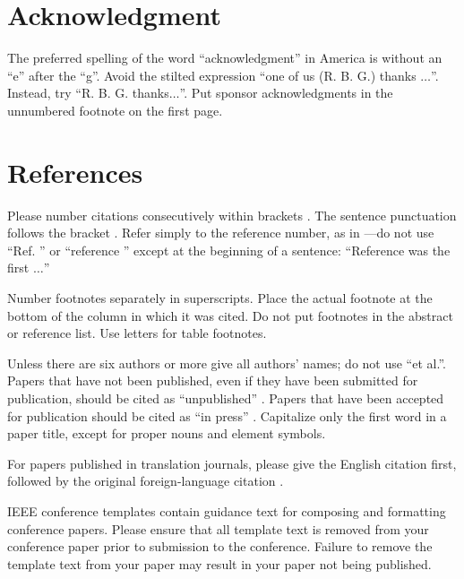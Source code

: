 \documentclass[conference]{IEEEtran}
\begin{document}
\section*{Acknowledgment}

The preferred spelling of the word ``acknowledgment'' in America is without an
``e'' after the ``g''. Avoid the stilted expression ``one of us (R. B. G.)
thanks $\ldots$''. Instead, try ``R. B. G. thanks$\ldots$''. Put sponsor
acknowledgments in the unnumbered footnote on the first page.

\section*{References}

Please number citations consecutively within brackets \cite{b1}. The sentence
punctuation follows the bracket \cite{b2}. Refer simply to the reference
number, as in \cite{b3}---do not use ``Ref. \cite{b3}'' or ``reference
\cite{b3}'' except at the beginning of a sentence: ``Reference \cite{b3} was
the first $\ldots$''

Number footnotes separately in superscripts. Place the actual footnote at the
bottom of the column in which it was cited. Do not put footnotes in the
abstract or reference list. Use letters for table footnotes.

Unless there are six authors or more give all authors' names; do not use ``et
al.''. Papers that have not been published, even if they have been submitted
for publication, should be cited as ``unpublished'' \cite{b4}. Papers that have
been accepted for publication should be cited as ``in press'' \cite{b5}.
Capitalize only the first word in a paper title, except for proper nouns and
element symbols.

For papers published in translation journals, please give the English citation
first, followed by the original foreign-language citation
\cite{PhilipsAndParks}.



\vspace{12pt}
\color{red}
IEEE conference templates contain guidance text for composing and formatting conference papers. Please ensure that all template text is removed from your conference paper prior to submission to the conference. Failure to remove the template text from your paper may result in your paper not being published.
\end{document}
